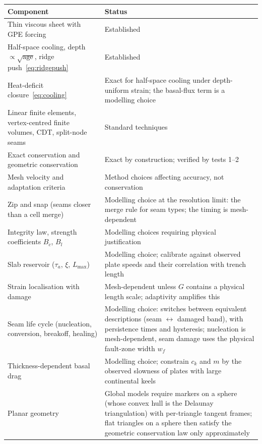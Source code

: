 \documentclass[11pt]{article}
\begin{document}
\begin{center}
\begin{tabular}{@{}p{}p{}@{}}
\toprule
Component & Status\\
\midrule
Thin viscous sheet with GPE forcing & Established\\
Half-space cooling, depth $\propto\sqrt{\text{age}}$, ridge push~\eqref{eq:ridgepush} & Established\\
Heat-deficit closure~\eqref{eq:cooling} & Exact for half-space cooling under depth-uniform strain; the basal-flux term is a modelling choice\\
Linear finite elements, vertex-centred finite volumes, CDT, split-node seams & Standard techniques\\
Exact conservation and geometric conservation & Exact by construction; verified by tests 1--2\\
Mesh velocity and adaptation criteria & Method choices affecting accuracy, not conservation\\
Zip and snap (seams closer than a cell merge) & Modelling choice at the resolution limit: the merge rule for seam types; the timing is mesh-dependent\\
Integrity law, strength coefficients $B_c$, $B_l$ & Modelling choices requiring physical justification\\
Slab reservoir ($\tau_a$, $\xi$, $L_{\max}$) & Modelling choice; calibrate against observed plate speeds and their correlation with trench length\\
Strain localisation with damage & Mesh-dependent unless $G$ contains a physical length scale; adaptivity amplifies this\\
Seam life cycle (nucleation, conversion, breakoff, healing) & Modelling choice: switches between equivalent descriptions (seam $\leftrightarrow$ damaged band), with persistence times and hysteresis; nucleation is mesh-dependent, seam damage uses the physical fault-zone width $w_f$\\
Thickness-dependent basal drag & Modelling choice; constrain $c_k$ and $m$ by the observed slowness of plates with large continental keels\\
Planar geometry & Global models require markers on a sphere (whose convex hull is the Delaunay triangulation) with per-triangle tangent frames; flat triangles on a sphere then satisfy the geometric conservation law only approximately\\
\bottomrule
\end{tabular}
\end{center}
\end{document}
